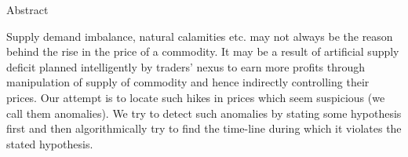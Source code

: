 \begin{center}
\LARGE{Abstract}
\end{center}

\vspace{0.5in}


Supply demand imbalance, natural calamities etc. may not always be the reason behind the rise in the price of a commodity. It may be a result of artificial supply deficit planned intelligently by traders’ nexus to earn more profits through manipulation of supply of commodity and hence indirectly controlling their prices. Our attempt is to locate such hikes in prices which seem suspicious (we call them anomalies). We try to detect such anomalies by stating some hypothesis first and then algorithmically try to find the time-line during which it violates the stated hypothesis.
